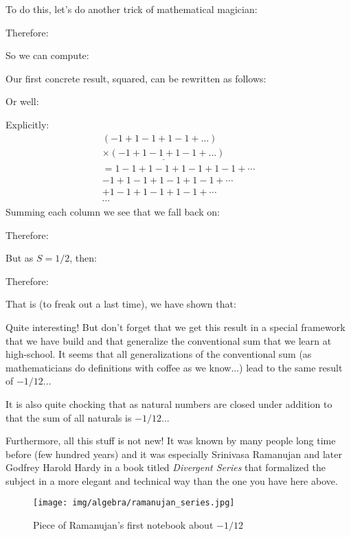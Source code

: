 	To do this, let's do another trick of mathematical magician:
	
	Therefore:
	
	So we can compute:
	
	Our first concrete result, squared, can be rewritten as follows:

	
	Or well:
	
	Explicitly:
   \begin{eqnarray*}
	   (-1 + 1-1 + 1-1 + \ldots)\\
	   \underline{\times (-1 + 1-1 + 1-1 + \ldots)} \\
	    =1-1 + 1-1 + 1-1 + 1-1 + \cdots \\ -1 + 1-1 + 1-1 + 1-1 + \cdots\\ + 1-1 + 1-1 + 1-1 + \cdots\\ \cdots
	\end{eqnarray*}
	Summing each column we see that we fall back on:
   
	Therefore:
	
   But as $S = 1/2$, then:
   
   Therefore:
   
   That is (to freak out a last time), we have shown that:
   
	Quite interesting! But don't forget that we get this result in a special framework that we have build and that generalize the conventional sum that we learn at high-school. It seems that all generalizations of the conventional sum (as mathematicians do definitions with coffee as we know...) lead to the same result of $-1/12$...
	
	It is also quite chocking that as natural numbers are closed under addition to that the sum of all naturals is $-1/12$...
	
	Furthermore, all this stuff is not new! It was known by many people long time before (few hundred years) and it was especially Srinivasa Ramanujan and later Godfrey Harold Hardy in a book titled \textit{Divergent Series} that formalized the subject in a more elegant and technical way than the one you have here above.
	\begin{figure}[H]
		\centering
		\texttt{[image: img/algebra/ramanujan\_series.jpg]}
		\caption[]{Piece of Ramanujan's first notebook about $-1/12$}
	\end{figure}
	
	\pagebreak
